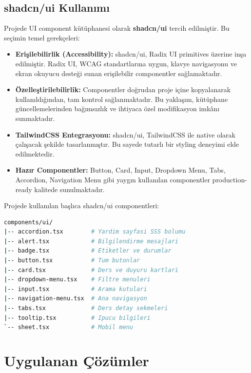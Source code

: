 \documentclass[12pt,a4paper]{article}
\begin{document}
\subsection{shadcn/ui Kullanımı}

Projede UI component kütüphanesi olarak \textbf{shadcn/ui} tercih edilmiştir. Bu seçimin temel gerekçeleri:

\begin{itemize}[leftmargin=*]
    \item \textbf{Erişilebilirlik (Accessibility):} shadcn/ui, Radix UI primitives üzerine inşa edilmiştir. Radix UI, WCAG standartlarına uygun, klavye navigasyonu ve ekran okuyucu desteği sunan erişilebilir componentler sağlamaktadır.
    
    \item \textbf{Özelleştirilebilirlik:} Componentler doğrudan proje içine kopyalanarak kullanıldığından, tam kontrol sağlanmaktadır. Bu yaklaşım, kütüphane güncellemelerinden bağımsızlık ve ihtiyaca özel modifikasyon imkânı sunmaktadır.
    
    \item \textbf{TailwindCSS Entegrasyonu:} shadcn/ui, TailwindCSS ile native olarak çalışacak şekilde tasarlanmıştır. Bu sayede tutarlı bir styling deneyimi elde edilmektedir.
    
    \item \textbf{Hazır Componentler:} Button, Card, Input, Dropdown Menu, Tabs, Accordion, Navigation Menu gibi yaygın kullanılan componentler production-ready kalitede sunulmaktadır.
\end{itemize}

Projede kullanılan başlıca shadcn/ui componentleri:

\begin{lstlisting}[language=bash, basicstyle=\ttfamily\small]
components/ui/
|-- accordion.tsx        # Yardim sayfasi SSS bolumu
|-- alert.tsx            # Bilgilendirme mesajlari
|-- badge.tsx            # Etiketler ve durumlar
|-- button.tsx           # Tum butonlar
|-- card.tsx             # Ders ve duyuru kartlari
|-- dropdown-menu.tsx    # Filtre menuleri
|-- input.tsx            # Arama kutulari
|-- navigation-menu.tsx  # Ana navigasyon
|-- tabs.tsx             # Ders detay sekmeleri
|-- tooltip.tsx          # Ipucu bilgileri
`-- sheet.tsx            # Mobil menu
\end{lstlisting}

\section{Uygulanan Çözümler}
\end{document}
